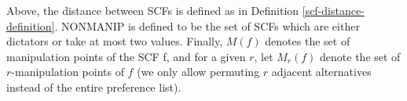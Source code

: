 	Above, the distance between SCFs is defined as in Definition \ref{scf-distance-definition}. NONMANIP is defined to be the set of SCFs which are either dictators or take at most two values. Finally, $M(f)$ denotes the set of manipulation points of the SCF f, and for a given $r$, let $M_r(f)$ denote the set of $r$-manipulation points of $f$ (we only allow permuting $r$ adjacent alternatives instead of the entire preference list).
